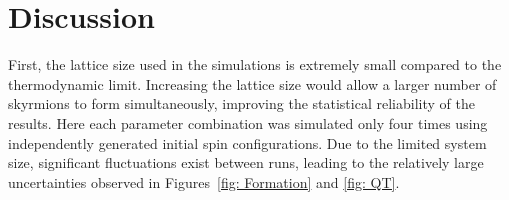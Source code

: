 %
%
%
%
%
%
%
%
%
%
%
\section{Discussion}

First, the lattice size used in the simulations is extremely small compared to the thermodynamic limit. Increasing the lattice size would allow a larger number of skyrmions to form simultaneously, improving the statistical reliability of the results. Here each parameter combination was simulated only four times using independently generated initial spin configurations. Due to the limited system size, significant fluctuations exist between runs, leading to the relatively large uncertainties observed in Figures~\ref{fig: Formation} and \ref{fig: QT}.

